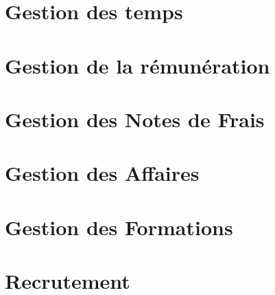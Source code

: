 \documentclass[12pt]{scrreprt}
\begin{document}

\chapter{Gestion des temps}



\chapter{Gestion de la rémunération}

\chapter{Gestion des Notes de Frais}


\chapter{Gestion des Affaires}


\chapter{Gestion des Formations}


\chapter{Recrutement}

% 
\end{document}

